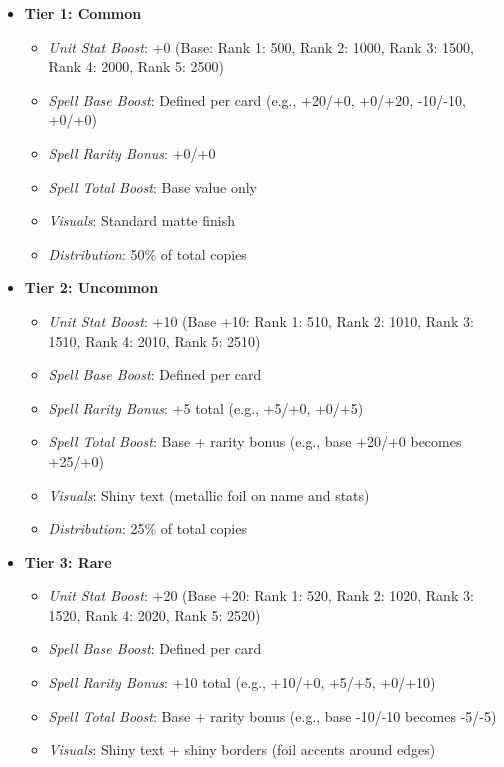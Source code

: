 \begin{itemize}
    \item \textbf{Tier 1: Common}
    \begin{itemize}
        \item \textit{Unit Stat Boost}: +0 (Base: Rank 1: 500, Rank 2: 1000, Rank 3: 1500, Rank 4: 2000, Rank 5: 2500)
        \item \textit{Spell Base Boost}: Defined per card (e.g., +20/+0, +0/+20, -10/-10, +0/+0)
        \item \textit{Spell Rarity Bonus}: +0/+0
        \item \textit{Spell Total Boost}: Base value only
        \item \textit{Visuals}: Standard matte finish
        \item \textit{Distribution}: 50\% of total copies
    \end{itemize}
    \item \textbf{Tier 2: Uncommon}
    \begin{itemize}
        \item \textit{Unit Stat Boost}: +10 (Base +10: Rank 1: 510, Rank 2: 1010, Rank 3: 1510, Rank 4: 2010, Rank 5: 2510)
        \item \textit{Spell Base Boost}: Defined per card
        \item \textit{Spell Rarity Bonus}: +5 total (e.g., +5/+0, +0/+5)
        \item \textit{Spell Total Boost}: Base + rarity bonus (e.g., base +20/+0 becomes +25/+0)
        \item \textit{Visuals}: Shiny text (metallic foil on name and stats)
        \item \textit{Distribution}: 25\% of total copies
    \end{itemize}
    \item \textbf{Tier 3: Rare}
    \begin{itemize}
        \item \textit{Unit Stat Boost}: +20 (Base +20: Rank 1: 520, Rank 2: 1020, Rank 3: 1520, Rank 4: 2020, Rank 5: 2520)
        \item \textit{Spell Base Boost}: Defined per card
        \item \textit{Spell Rarity Bonus}: +10 total (e.g., +10/+0, +5/+5, +0/+10)
        \item \textit{Spell Total Boost}: Base + rarity bonus (e.g., base -10/-10 becomes -5/-5)
        \item \textit{Visuals}: Shiny text + shiny borders (foil accents around edges)

\end{itemize}
\end{itemize}
